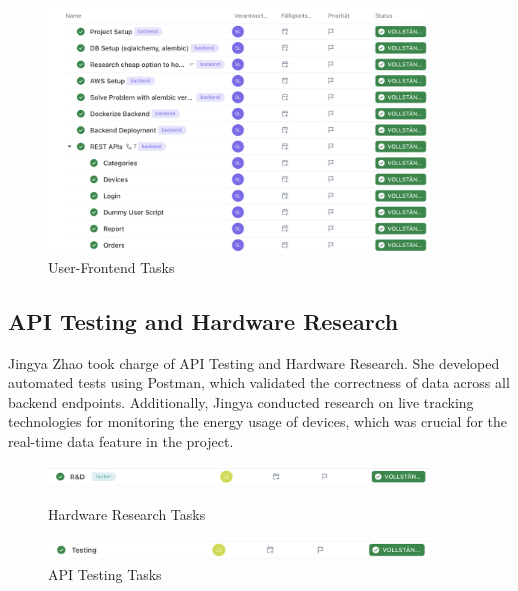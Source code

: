 \begin{figure}[h]
    \centering
    \includegraphics[width=0.9\textwidth]{images/backend.png}
    \caption{User-Frontend Tasks}
    \label{fig:myimage}
\end{figure}
\clearpage
\subsection{API Testing and Hardware Research}
Jingya Zhao took charge of API Testing and Hardware Research. She developed automated tests using Postman, which validated the correctness of data across all backend endpoints. Additionally, Jingya conducted research on live tracking technologies for monitoring the energy usage of devices, which was crucial for the real-time data feature in the project.

\begin{figure}[h]
    \centering
    \includegraphics[width=0.9\textwidth]{images/R&d.png}
    \caption{Hardware Research Tasks}
    \label{fig:myimage}
    \vspace{1cm}
    \includegraphics[width=0.9\textwidth]{images/testing.png}
    \caption{API Testing Tasks}
    \label{fig:myimage}
\end{figure}

